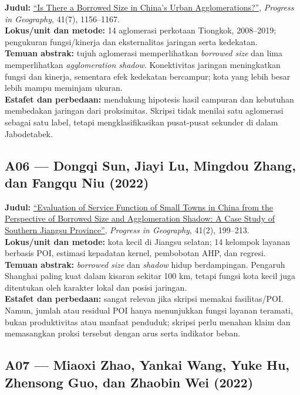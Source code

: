\documentclass[
  indonesian,
  11pt,
  a4paper,
  oneside,
  openany]{report}
\begin{document}
\textbf{Judul:} \href{https://doi.org/10.18306/dlkxjz.2022.07.002}{``Is
There a Borrowed Size in China's Urban Agglomerations?''},
\emph{Progress in Geography}, 41(7), 1156--1167.\\
\textbf{Lokus/unit dan metode:} 14 aglomerasi perkotaan Tiongkok,
2008--2019; pengukuran fungsi/kinerja dan eksternalitas jaringan serta
kedekatan.\\
\textbf{Temuan abstrak:} tujuh aglomerasi memperlihatkan \emph{borrowed
size} dan lima memperlihatkan \emph{agglomeration shadow}. Konektivitas
jaringan meningkatkan fungsi dan kinerja, sementara efek kedekatan
bercampur; kota yang lebih besar lebih mampu meminjam ukuran.\\
\textbf{Estafet dan perbedaan:} mendukung hipotesis hasil campuran dan
kebutuhan membedakan jaringan dari proksimitas. Skripsi tidak menilai
satu aglomerasi sebagai satu label, tetapi mengklasifikasikan
pusat-pusat sekunder di dalam Jabodetabek.

\subsection{A06 --- Dongqi Sun, Jiayi Lu, Mingdou Zhang, dan Fangqu Niu
(2022)}\label{a06-dongqi-sun-jiayi-lu-mingdou-zhang-dan-fangqu-niu-2022}

\textbf{Judul:}
\href{https://doi.org/10.18306/dlkxjz.2022.02.002}{``Evaluation of
Service Function of Small Towns in China from the Perspective of
Borrowed Size and Agglomeration Shadow: A Case Study of Southern Jiangsu
Province''}, \emph{Progress in Geography}, 41(2), 199--213.\\
\textbf{Lokus/unit dan metode:} kota kecil di Jiangsu selatan; 14
kelompok layanan berbasis POI, estimasi kepadatan kernel, pembobotan
AHP, dan regresi.\\
\textbf{Temuan abstrak:} \emph{borrowed size} dan \emph{shadow} hidup
berdampingan. Pengaruh Shanghai paling kuat dalam kisaran sekitar 100
km, tetapi fungsi kota kecil juga ditentukan oleh karakter lokal dan
posisi jaringan.\\
\textbf{Estafet dan perbedaan:} sangat relevan jika skripsi memakai
fasilitas/POI. Namun, jumlah atau residual POI hanya menunjukkan fungsi
layanan teramati, bukan produktivitas atau manfaat penduduk; skripsi
perlu menahan klaim dan memasangkan proksi tersebut dengan arus serta
indikator beban.

\subsection{A07 --- Miaoxi Zhao, Yankai Wang, Yuke Hu, Zhensong Guo, dan
Zhaobin Wei
(2022)}\label{a07-miaoxi-zhao-yankai-wang-yuke-hu-zhensong-guo-dan-zhaobin-wei-2022}
\end{document}
